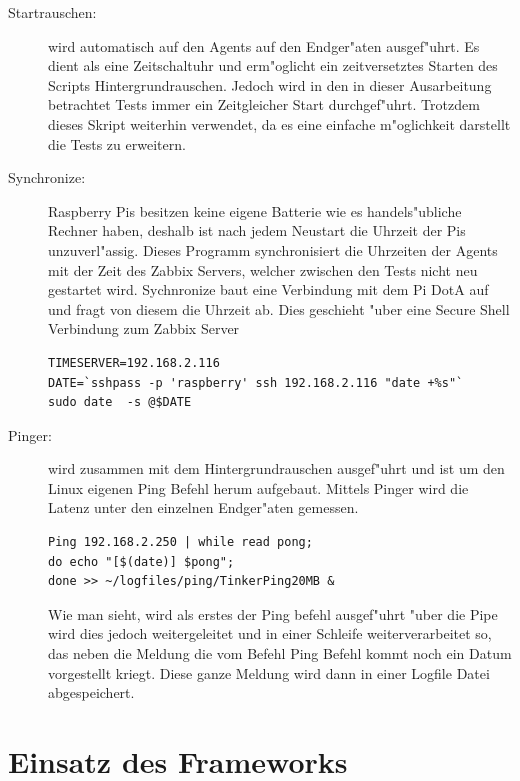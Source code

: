 \begin{enumerate}
\begin{description}
\item[Startrauschen:]wird automatisch auf den Agents auf den Endger"aten ausgef"uhrt. Es dient als eine Zeitschaltuhr %
und erm"oglicht ein zeitversetztes Starten des Scripts Hintergrundrauschen. %
Jedoch wird in den in dieser Ausarbeitung betrachtet Tests immer ein Zeitgleicher Start %
durchgef"uhrt. Trotzdem dieses Skript weiterhin verwendet, da es eine einfache %
m"oglichkeit darstellt die Tests zu erweitern. %

\item[Synchronize:]Raspberry Pis besitzen keine eigene Batterie wie es handels"ubliche Rechner haben, %
deshalb ist nach jedem Neustart die Uhrzeit der Pis unzuverl"assig. Dieses Programm synchronisiert %
die Uhrzeiten der Agents mit der Zeit des Zabbix Servers, welcher zwischen den Tests nicht neu gestartet wird. %
Sychnronize baut eine Verbindung mit dem Pi DotA auf und fragt von diesem die Uhrzeit ab. %
Dies geschieht "uber eine Secure Shell Verbindung zum Zabbix Server %
\begin{verbatim}
TIMESERVER=192.168.2.116
DATE=`sshpass -p 'raspberry' ssh 192.168.2.116 "date +%s"`
sudo date  -s @$DATE 
\end{verbatim}

\item[Pinger:]wird zusammen mit dem Hintergrundrauschen ausgef"uhrt und ist um den Linux eigenen Ping Befehl %
herum aufgebaut. Mittels Pinger wird die Latenz unter den einzelnen Endger"aten gemessen. %
\begin{verbatim}
Ping 192.168.2.250 | while read pong; 
do echo "[$(date)] $pong"; 
done >> ~/logfiles/ping/TinkerPing20MB &
\end{verbatim}
Wie man sieht, wird als erstes der Ping befehl ausgef"uhrt "uber die Pipe wird dies jedoch weitergeleitet und in %
einer Schleife weiterverarbeitet so, das neben die Meldung die vom Befehl Ping Befehl kommt noch ein Datum vorgestellt %
kriegt. Diese ganze Meldung wird dann in einer Logfile Datei abgespeichert.
\end{description}
\end{enumerate}
\section{Einsatz des Frameworks} 

